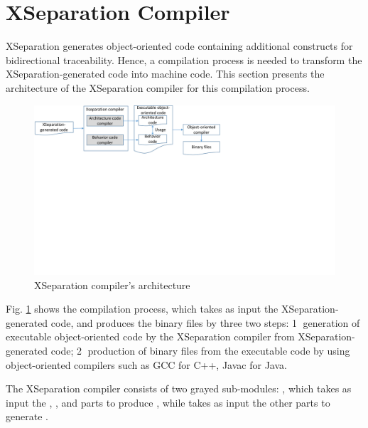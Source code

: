 \section{XSeparation Compiler}
\label{sec:compilation}
XSeparation generates object-oriented code containing additional constructs for bidirectional traceability. Hence, a compilation process is needed to transform the XSeparation-generated code into machine code.
This section presents the architecture of the XSeparation compiler for this compilation process.

\begin{figure}
	\centering
	\includegraphics[clip, trim=0cm 13.3cm 12.8cm 0cm, width=\columnwidth]{figures/compilerarchitecture.pdf}
	\caption{XSeparation compiler's architecture} 
	\label{fig:compilerarchitecture}
\end{figure}
 
Fig. \ref{fig:compilerarchitecture} shows the compilation process, which takes as input the XSeparation-generated code, and produces the binary files by three two steps: \textcircled{1} generation of executable object-oriented code by the XSeparation compiler from XSeparation-generated code; \textcircled{2} production of binary files from the executable code by using object-oriented compilers such as GCC for C++, Javac for Java.

The XSeparation compiler consists of two grayed sub-modules: , which takes as input the , , and  parts to produce , while  takes as input the other parts to generate . 

\begin{minipage}{0.95\columnwidth}
	
\end{minipage} 

